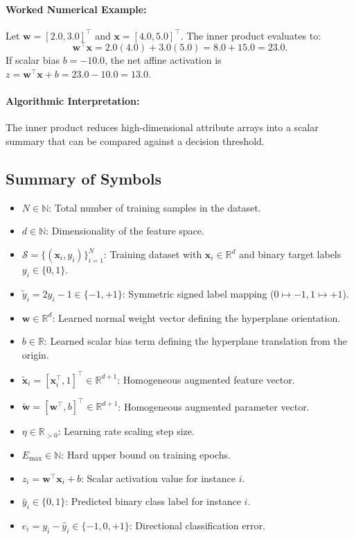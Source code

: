 \documentclass[11pt]{article}
\begin{document}
\paragraph{Worked Numerical Example:}
Let $\mathbf{w} = [2.0, 3.0]^\top$ and $\mathbf{x} = [4.0, 5.0]^\top$. The inner product evaluates to:
\begin{equation}
\mathbf{w}^\top \mathbf{x} = 2.0(4.0) + 3.0(5.0) = 8.0 + 15.0 = 23.0.
\end{equation}
If scalar bias $b = -10.0$, the net affine activation is $z = \mathbf{w}^\top \mathbf{x} + b = 23.0 - 10.0 = 13.0$.

\paragraph{Algorithmic Interpretation:}
The inner product reduces high-dimensional attribute arrays into a scalar summary that can be compared against a decision threshold.

\subsection{Summary of Symbols}
\begin{itemize}
    \item $N \in \mathbb{N}$: Total number of training samples in the dataset.
    \item $d \in \mathbb{N}$: Dimensionality of the feature space.
    \item $\mathcal{S} = \{(\mathbf{x}_i, y_i)\}_{i=1}^N$: Training dataset with $\mathbf{x}_i \in \mathbb{R}^d$ and binary target labels $y_i \in \{0, 1\}$.
    \item $\tilde{y}_i = 2y_i - 1 \in \{-1, +1\}$: Symmetric signed label mapping ($0 \mapsto -1, 1 \mapsto +1$).
    \item $\mathbf{w} \in \mathbb{R}^d$: Learned normal weight vector defining the hyperplane orientation.
    \item $b \in \mathbb{R}$: Learned scalar bias term defining the hyperplane translation from the origin.
    \item $\tilde{\mathbf{x}}_i = [\mathbf{x}_i^\top, 1]^\top \in \mathbb{R}^{d+1}$: Homogeneous augmented feature vector.
    \item $\tilde{\mathbf{w}} = [\mathbf{w}^\top, b]^\top \in \mathbb{R}^{d+1}$: Homogeneous augmented parameter vector.
    \item $\eta \in \mathbb{R}_{>0}$: Learning rate scaling step size.
    \item $E_{\max} \in \mathbb{N}$: Hard upper bound on training epochs.
    \item $z_i = \mathbf{w}^\top \mathbf{x}_i + b$: Scalar activation value for instance $i$.
    \item $\hat{y}_i \in \{0, 1\}$: Predicted binary class label for instance $i$.
    \item $e_i = y_i - \hat{y}_i \in \{-1, 0, +1\}$: Directional classification error.
\end{itemize}
\end{document}
